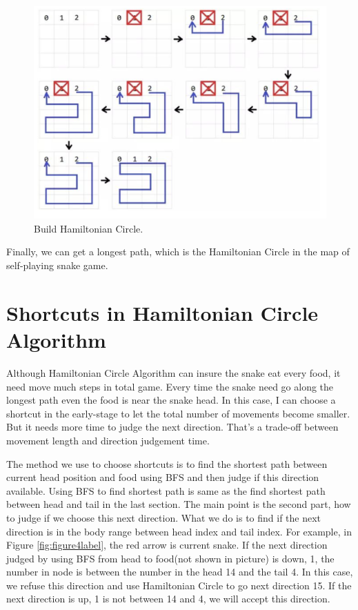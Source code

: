 \documentclass[12pt]{article}
\begin{document}
\begin{figure}[H]
\centering 
\includegraphics[scale = 0.4]{2.png}
\caption{Build Hamiltonian Circle.}
\label{fig:figure3label}
\end{figure}

Finally, we can get a longest path, which is the Hamiltonian Circle in the map of self-playing snake game.

\section{Shortcuts in Hamiltonian Circle Algorithm}

Although Hamiltonian Circle Algorithm can insure the snake eat every food, it need move much steps in total game. Every time the snake need go along the longest path even the food is near the snake head. In this case, I can choose a shortcut in the early-stage to let the total number of movements become smaller. But it needs more time to judge the next direction. That's a trade-off between movement length and direction judgement time. 

The method we use to choose shortcuts is to find the shortest path between current head position and food using BFS and then judge if this direction available. Using BFS to find shortest path is same as the find shortest path between head and tail in the last section. The main point is the second part, how to judge if we choose this next direction. What we do is to find if the next direction is in the body range between head index and tail index. For example, in Figure \ref{fig:figure4label}, the red arrow is current snake. If the next direction judged by using BFS from head to food(not shown in picture) is down, 1, the number in node is  between the number in the head 14 and the tail 4. In this case, we refuse this direction and use Hamiltonian Circle to go next direction 15. If the next direction is up, 1 is not between 14 and 4, we will accept this direction.  
\end{document}
